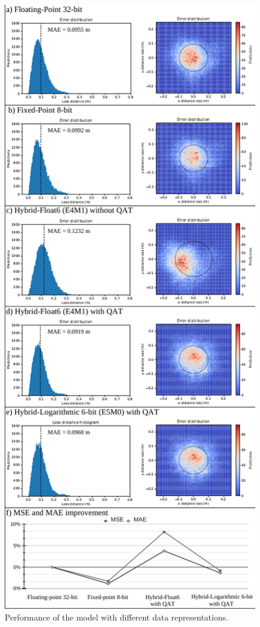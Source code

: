 \begin{figure}[h!]
	\centering
	\includegraphics[width=\columnwidth]{../figures/histograms/model_evaluation.pdf}
	\caption{Performance of the model with different data representations.}
	\label{fig:model_evaluation}
\end{figure}

